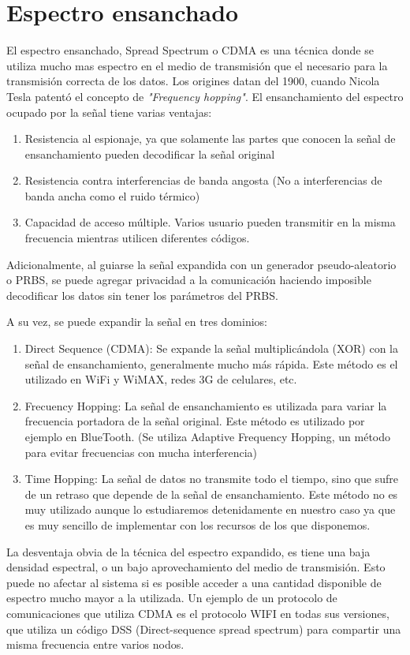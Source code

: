 \section{Espectro ensanchado}
\label{espectroensanchado}
El espectro ensanchado, Spread Spectrum o CDMA es una técnica donde se utiliza mucho mas espectro en el medio de transmisión que el necesario para la transmisión correcta de los datos.
Los origines datan del 1900, cuando Nicola Tesla patentó el concepto de \textit{"Frequency hopping"}.
El ensanchamiento del espectro ocupado por la señal tiene varias ventajas:
\begin{enumerate} 
\item Resistencia al espionaje, ya que solamente las partes que conocen la señal de ensanchamiento pueden decodificar la señal original
\item Resistencia contra interferencias de banda angosta (No a interferencias de banda ancha como el ruido térmico)
\item Capacidad de acceso múltiple. Varios usuario pueden transmitir en la misma frecuencia mientras utilicen diferentes códigos.
\end{enumerate} 
Adicionalmente, al guiarse la señal expandida con un generador pseudo-aleatorio o PRBS, se puede agregar privacidad a la comunicación haciendo imposible decodificar los datos sin tener los parámetros del PRBS.

A su vez, se puede expandir la señal en tres dominios:
\begin{enumerate} 
\item Direct Sequence (CDMA): Se expande la señal multiplicándola (XOR) con la señal de ensanchamiento, generalmente mucho más rápida. Este método es el utilizado en WiFi y WiMAX, redes 3G de celulares, etc.
\item Frecuency Hopping: La señal de ensanchamiento es utilizada para variar la frecuencia portadora de la señal original. Este método es utilizado por ejemplo en BlueTooth. (Se utiliza Adaptive Frequency Hopping, un método para evitar frecuencias con mucha interferencia)
\item Time Hopping: La señal de datos no transmite todo el tiempo, sino que sufre de un retraso que depende de la señal de ensanchamiento. Este método no es muy utilizado aunque lo estudiaremos detenidamente en nuestro caso ya que es muy sencillo de implementar con los recursos de los que disponemos.
\end{enumerate} 


La desventaja obvia de la técnica del espectro expandido, es tiene una baja densidad espectral, o un bajo aprovechamiento del medio de transmisión. Esto puede no afectar al sistema si es posible acceder a una cantidad disponible de espectro mucho mayor a la utilizada. Un ejemplo de un protocolo de comunicaciones que utiliza CDMA es el protocolo WIFI en todas sus versiones, que utiliza un código DSS (Direct-sequence spread spectrum) para compartir una misma frecuencia entre varios nodos.

